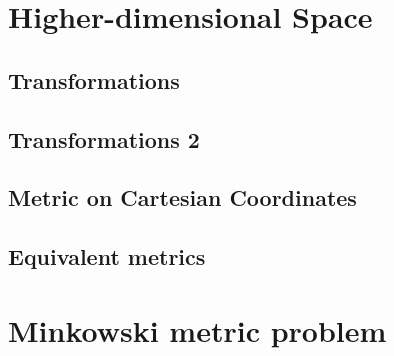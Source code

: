 \documentclass{article}
\begin{document}
	\section{Higher-dimensional Space}
		\subsection{Transformations}
		\subsection{Transformations 2}
		\subsection{Metric on Cartesian Coordinates}
		\subsection{Equivalent metrics}
	\section{Minkowski metric problem}
		
\end{document}
